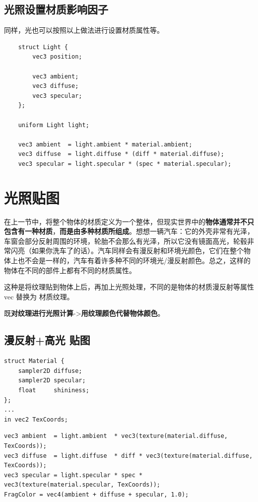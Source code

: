 \documentclass[UTF8,a4paper,12pt]{ctexbook}
\begin{document}
			
			
		\subsection{光照设置材质影响因子}
			同样，光也可以按照以上做法进行设置材质属性等。
		
			\begin{lstlisting}
	struct Light {
	    vec3 position;
	
	    vec3 ambient;
	    vec3 diffuse;
	    vec3 specular;
	};
	
	uniform Light light;		
			
	vec3 ambient  = light.ambient * material.ambient;
	vec3 diffuse  = light.diffuse * (diff * material.diffuse);
	vec3 specular = light.specular * (spec * material.specular);			
			\end{lstlisting}
		
	
	\section{光照贴图}	
		在上一节中，将整个物体的材质定义为一个整体，但现实世界中的\textbf{物体通常并不只包含有一种材质}，\textbf{而是由多种材质所组成}。想想一辆汽车：它的外壳非常有光泽，车窗会部分反射周围的环境，轮胎不会那么有光泽，所以它没有镜面高光，轮毂非常闪亮（如果你洗车了的话）。汽车同样会有漫反射和环境光颜色，它们在整个物体上也不会是一样的，汽车有着许多种不同的环境光/漫反射颜色。总之，这样的物体在不同的部件上都有不同的材质属性。
		
		
		这种是将纹理贴到物体上后，再加上光照处理，不同的是物体的材质漫反射等属性vec 替换为 材质纹理。
		
		
		既\textbf{对纹理进行光照计算}->\textbf{用纹理颜色代替物体颜色}。
		
		\subsection{漫反射+高光 贴图}
			\begin{lstlisting}
struct Material {
    sampler2D diffuse;
    sampler2D specular;
	float     shininess;
}; 
...
in vec2 TexCoords;
			\end{lstlisting}
			
			\begin{lstlisting}
vec3 ambient  = light.ambient  * vec3(texture(material.diffuse, TexCoords));
vec3 diffuse  = light.diffuse  * diff * vec3(texture(material.diffuse, TexCoords));  
vec3 specular = light.specular * spec * vec3(texture(material.specular, TexCoords));
FragColor = vec4(ambient + diffuse + specular, 1.0);			
			\end{lstlisting}
			
\end{document}

